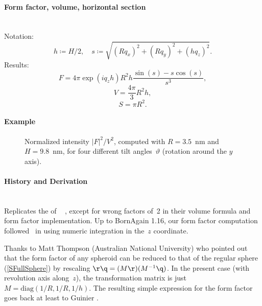 \paragraph{Form factor, volume, horizontal section}\strut\\
Notation:
\begin{equation*}
 h \coloneqq H/2, \quad
 s \coloneqq \sqrt{(R q_x)^2 + (R q_y)^2 + (h q_z)^2}.
\end{equation*}
Results:
\begin{equation*}
  F = 4\pi \exp(i q_z h) R^2 h\frac{\sin(s)-s\cos(s)}{s^3},
\end{equation*}
\begin{equation*}
  V =\dfrac{4\pi}{3}R^2h,
\end{equation*}
\begin{equation*}
  S =\pi R^2.
\end{equation*}

\paragraph{Example}\strut

\begin{figure}[H]
\begin{center}
\end{center}
\caption{Normalized intensity $|F|^2/V^2$,
computed with $R=3.5$~nm and $H=9.8$~nm,
for four different tilt angles~$\vartheta$ (rotation around the $y$ axis).}
\end{figure}

\paragraph{History and Derivation}\strut\\
Replicates the  of \IsGISAXS\
\cite[Eq.~2.37]{Laz06} \cite[Eq.~227]{ReLL09},
except for wrong factors of~2 in their volume formula and form factor implementation.
Up to BornAgain 1.16,
our form factor computation followed \IsGISAXS\
in using numeric integration in the~$z$ coordinate.

Thanks to Matt Thompson (Australian National University)
who pointed out that
the form factor of any spheroid
can be reduced to that of the regular sphere (\cref{SFullSphere})
by rescaling $\r\q=(M\r)(M^{-1}\q)$.
In the present case (with revolution axis along~$z$),
the transformation matrix is just $M=\text{diag}(1/R, 1/R, 1/h)$.
The resulting simple expression for the form factor
goes back at least to Guinier \cite[p.~193]{Gui39}.

